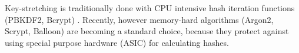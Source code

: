 Key-stretching \cite{blocki2018economics} is traditionally done with CPU intensive hash iteration functions (PBKDF2, Bcrypt) \cite{kaliski2000pkcs, provos1999bcrypt}. Recently, however memory-hard algorithms (Argon2, Scrypt, Balloon) \cite{biryukov2016argon2, percival2016scrypt, boneh2016balloon} are becoming a standard choice, because they protect against using special purpose hardware (ASIC) for calculating hashes.